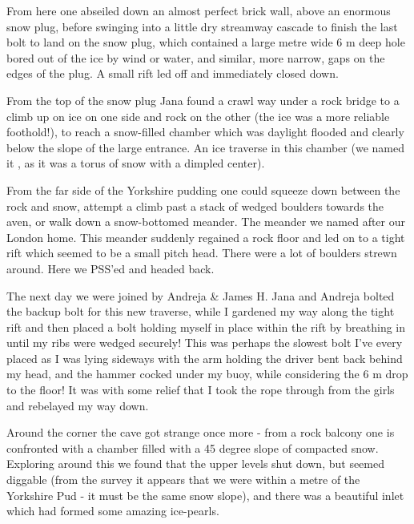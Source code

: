 From here one
abseiled down an almost perfect brick wall, above an enormous snow plug,
before swinging into a little dry streamway cascade to finish the last
bolt to land on the snow plug, which contained a large metre wide 6 m
deep hole bored out of the ice by wind or water, and similar, more
narrow, gaps on the edges of the plug. A small rift led off and
immediately closed down. 

From the top of the snow plug Jana found a
crawl way under a rock bridge to a climb up on ice on one side and rock
on the other (the ice was a more reliable foothold!), to reach a
snow-filled chamber which was daylight flooded and clearly below the
slope of the large entrance. An ice traverse in this chamber (we named
it , as it was a torus of snow with a dimpled center).

From the far side of the Yorkshire pudding one could squeeze down
between the rock and snow, attempt a climb past a stack of wedged
boulders towards the aven, or walk down a snow-bottomed meander. The
meander we named  after our London home. This meander
suddenly regained a rock floor and led on to a tight rift which seemed
to be a small pitch head. There were a lot of boulders strewn around.
Here we PSS'ed and headed back.

The next day we were joined by Andreja \& James H. Jana and Andreja
bolted the backup bolt for this new traverse, while I gardened my way
along the tight rift and then placed a bolt holding myself in place
within the rift by breathing in until my ribs were wedged securely! This
was perhaps the slowest bolt I've every placed as I was lying sideways
with the arm holding the driver bent back behind my head, and the hammer
cocked under my buoy, while considering the 6 m drop to the floor! It
was with some relief that I took the rope through from the girls and
rebelayed my way down.


Around the corner the cave got strange once more - from a rock balcony
one is confronted with a chamber filled with a 45 degree slope of
compacted snow. Exploring around this we found that the upper levels
shut down, but seemed diggable (from the survey it appears that we were
within a metre of the Yorkshire Pud - it must be the same snow slope),
and there was a beautiful inlet which had formed some amazing
ice-pearls. 

